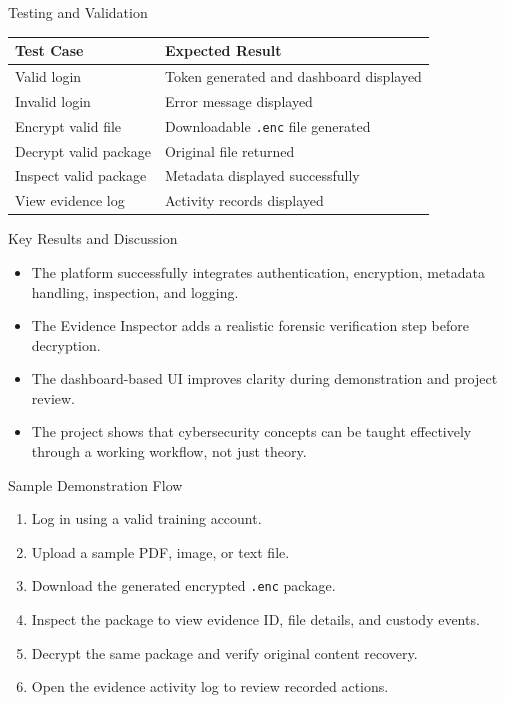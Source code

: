 \documentclass[aspectratio=169]{beamer}
\begin{document}
\begin{frame}{Testing and Validation}
    \begin{table}
        \centering
        \small
        \begin{tabularx}{\textwidth}{|X|X|}
            \hline
            \textbf{Test Case} & \textbf{Expected Result} \\ \hline
            Valid login & Token generated and dashboard displayed \\ \hline
            Invalid login & Error message displayed \\ \hline
            Encrypt valid file & Downloadable \texttt{.enc} file generated \\ \hline
            Decrypt valid package & Original file returned \\ \hline
            Inspect valid package & Metadata displayed successfully \\ \hline
            View evidence log & Activity records displayed \\ \hline
        \end{tabularx}
    \end{table}
\end{frame}

\begin{frame}{Key Results and Discussion}
    \begin{itemize}
        \item The platform successfully integrates authentication, encryption, metadata handling, inspection, and logging.
        \item The Evidence Inspector adds a realistic forensic verification step before decryption.
        \item The dashboard-based UI improves clarity during demonstration and project review.
        \item The project shows that cybersecurity concepts can be taught effectively through a working workflow, not just theory.
    \end{itemize}
\end{frame}

\begin{frame}{Sample Demonstration Flow}
    \begin{enumerate}
        \item Log in using a valid training account.
        \item Upload a sample PDF, image, or text file.
        \item Download the generated encrypted \texttt{.enc} package.
        \item Inspect the package to view evidence ID, file details, and custody events.
        \item Decrypt the same package and verify original content recovery.
        \item Open the evidence activity log to review recorded actions.
    \end{enumerate}
\end{frame}
\end{document}
